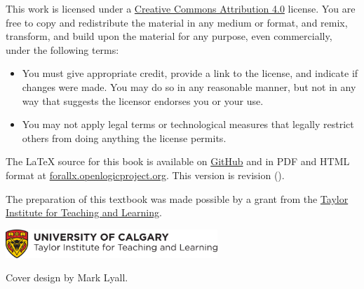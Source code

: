 \iflatexml\else
\bigskip

\noindent \footnotesize
\fi
This work is licensed under a \href{https://creativecommons.org/licenses/by/4.0/}{Creative Commons Attribution 4.0} license.
You are free to copy and redistribute the material in any medium or format, and  remix, transform, and build upon the material for any purpose, even commercially, under the following terms:
\begin{itemize}
\item You must give appropriate credit, provide a link to the license, and indicate if changes were made. You may do so in any reasonable manner, but not in any way that suggests the licensor endorses you or your use.
\item You may not apply legal terms or technological measures that legally restrict others from doing anything the license permits.
\end{itemize}

\iflatexml\else
\vfil\normalsize\noindent
\fi
The \LaTeX{} source for this book is available on
\href{https://github.com/rzach/forallx-yyc/}{GitHub} and in PDF and
HTML format at
\href{https://forallx.openlogicproject.org}{forallx.openlogicproject.org}.
\iflatexml\else This version is revision \gitAbbrevHash{}
(\gitAuthorDate).

\bigskip
\noindent
\fi
The preparation of this textbook was made possible by a grant from the \href{https://taylorinstitute.ucalgary.ca/}{Taylor Institute for Teaching and Learning}.

\iflatexml\else
\bigskip
\noindent
\href{https://taylorinstitute.ucalgary.ca/}{\includegraphics[width=8cm]{assets/ti-color}}

\bigskip
\noindent Cover design by Mark Lyall.
\fi
